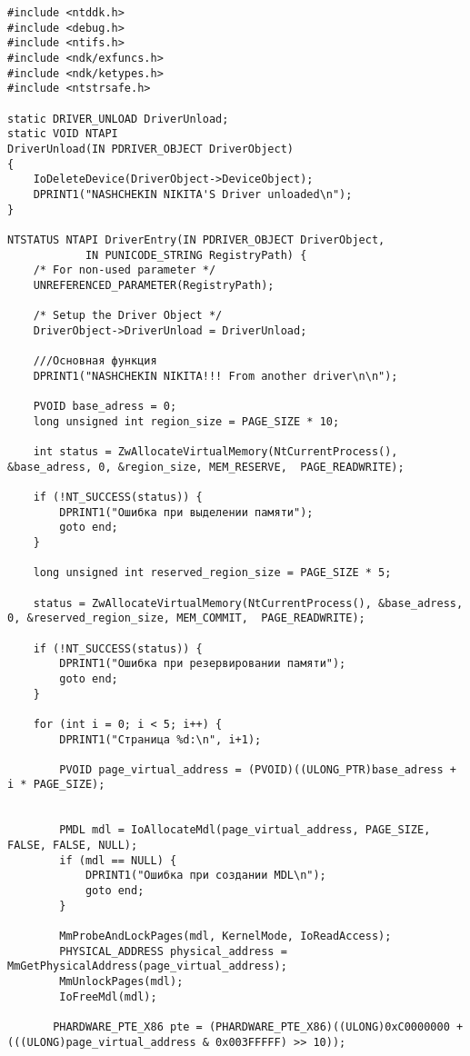 \documentclass[a4paper, 14pt]{extarticle}
\begin{document}
\begin{verbatim}
#include <ntddk.h>
#include <debug.h>
#include <ntifs.h>
#include <ndk/exfuncs.h>
#include <ndk/ketypes.h>
#include <ntstrsafe.h>

static DRIVER_UNLOAD DriverUnload;
static VOID NTAPI
DriverUnload(IN PDRIVER_OBJECT DriverObject)
{
    IoDeleteDevice(DriverObject->DeviceObject);
	DPRINT1("NASHCHEKIN NIKITA'S Driver unloaded\n");
}

NTSTATUS NTAPI DriverEntry(IN PDRIVER_OBJECT DriverObject,
            IN PUNICODE_STRING RegistryPath) {
    /* For non-used parameter */
    UNREFERENCED_PARAMETER(RegistryPath);

    /* Setup the Driver Object */
    DriverObject->DriverUnload = DriverUnload;

	///Основная функция
    DPRINT1("NASHCHEKIN NIKITA!!! From another driver\n\n");

    PVOID base_adress = 0;
    long unsigned int region_size = PAGE_SIZE * 10;

    int status = ZwAllocateVirtualMemory(NtCurrentProcess(), &base_adress, 0, &region_size, MEM_RESERVE,  PAGE_READWRITE);

    if (!NT_SUCCESS(status)) {
        DPRINT1("Ошибка при выделении памяти");
        goto end;
    }

    long unsigned int reserved_region_size = PAGE_SIZE * 5;

    status = ZwAllocateVirtualMemory(NtCurrentProcess(), &base_adress, 0, &reserved_region_size, MEM_COMMIT,  PAGE_READWRITE);

    if (!NT_SUCCESS(status)) {
        DPRINT1("Ошибка при резервировании памяти");
        goto end;
    }

    for (int i = 0; i < 5; i++) {
        DPRINT1("Страница %d:\n", i+1);

        PVOID page_virtual_address = (PVOID)((ULONG_PTR)base_adress + i * PAGE_SIZE);


        PMDL mdl = IoAllocateMdl(page_virtual_address, PAGE_SIZE, FALSE, FALSE, NULL);
        if (mdl == NULL) {
            DPRINT1("Ошибка при создании MDL\n");
            goto end;
        }

        MmProbeAndLockPages(mdl, KernelMode, IoReadAccess);
        PHYSICAL_ADDRESS physical_address = MmGetPhysicalAddress(page_virtual_address);
        MmUnlockPages(mdl);
        IoFreeMdl(mdl);

       PHARDWARE_PTE_X86 pte = (PHARDWARE_PTE_X86)((ULONG)0xC0000000 + (((ULONG)page_virtual_address & 0x003FFFFF) >> 10));



\end{verbatim}
\end{document}

